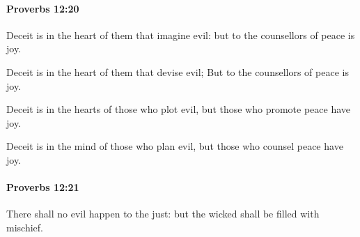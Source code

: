		\paragraph{Proverbs 12:20} %
			\label{PROVERBS-12-20}

			Deceit is in the heart of them that imagine evil: but to the counsellors of peace is joy.

			\begin{versebox}
					\item[BHS] 
					\item[ASV] Deceit is in the heart of them that devise evil; But to the counsellors of peace is joy.
					\item[NIV] Deceit is in the hearts of those who plot evil, but those who promote peace have joy.
					\item[NRSV] Deceit is in the mind of those who plan evil, but those who counsel peace have joy.
			\end{versebox}

		\paragraph{Proverbs 12:21} %
			\label{PROVERBS-12-21}

			There shall no evil happen to the just: but the wicked shall be filled with mischief.


